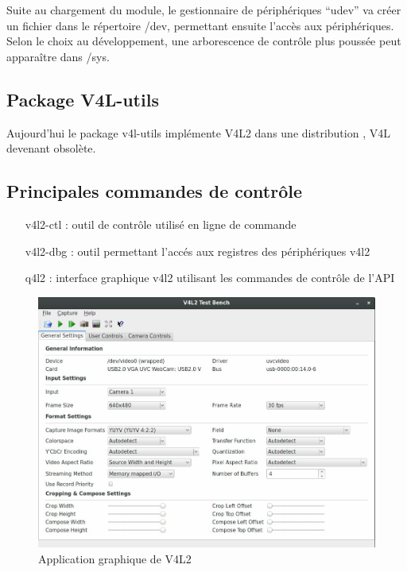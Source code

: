 Suite au chargement du module, le gestionnaire de périphériques “udev” va créer un
fichier dans le répertoire /dev, permettant ensuite l’accès aux périphériques. Selon le choix
au développement, une arborescence de contrôle plus poussée peut apparaître dans /sys.

\subsection{Package V4L-utils}

Aujourd'hui le package v4l-utils implémente V4L2 dans une distribution , V4L devenant obsolète.

\subsection{Principales commandes de contrôle}

\begin{itemize}
    \item[v4l2-ctl : ]  outil de contrôle utilisé en ligne de commande
    \item[v4l2-dbg : ] outil permettant l'accés aux registres des périphériques v4l2
    \item[q4l2 : ] interface graphique v4l2 utilisant les commandes de contrôle de l'API
\end{itemize}

\begin{figure}[!htb]
    \centering
    \includegraphics[trim={0cm 0cm 0cm 0cm},clip,scale=0.35]{Figures/v4l2.png}
    \decoRule
    \caption{Application graphique de V4L2} \label{fig:v4l2}
\end{figure}

